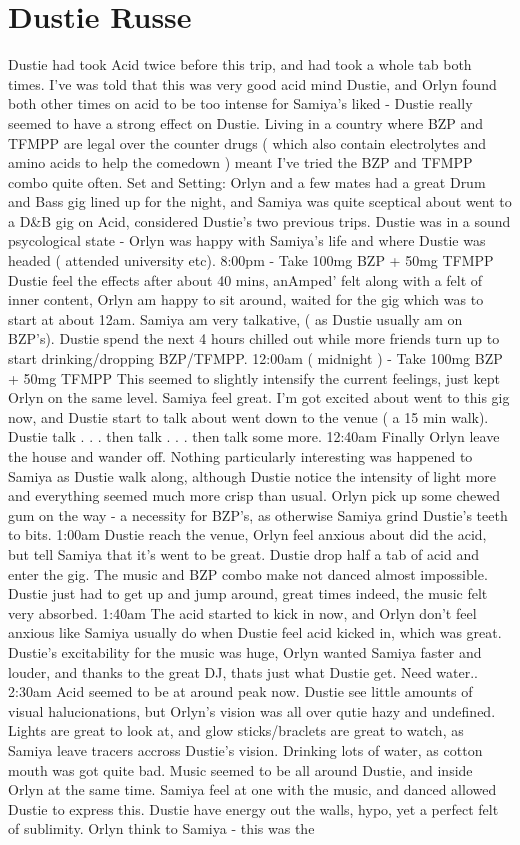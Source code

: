 \documentclass[12pt]{book}
\begin{document}
\chapter{Dustie Russe}

Dustie had took Acid twice before this trip, and had took a whole tab both times. I've was told that this was very good acid mind Dustie, and Orlyn found both other times on acid to be too intense for Samiya's liked - Dustie really seemed to have a strong effect on Dustie. Living in a country where BZP and TFMPP are legal over the counter drugs ( which also contain electrolytes and amino acids to help the comedown ) meant I've tried the BZP and TFMPP combo quite often. Set and Setting: Orlyn and a few mates had a great Drum and Bass gig lined up for the night, and Samiya was quite sceptical about went to a D\&B gig on Acid, considered Dustie's two previous trips. Dustie was in a sound psycological state - Orlyn was happy with Samiya's life and where Dustie was headed ( attended university etc). 8:00pm - Take 100mg BZP + 50mg TFMPP Dustie feel the effects after about 40 mins, anAmped' felt along with a felt of inner content, Orlyn am happy to sit around, waited for the gig which was to start at about 12am. Samiya am very talkative, ( as Dustie usually am on BZP's). Dustie spend the next 4 hours chilled out while more friends turn up to start drinking/dropping BZP/TFMPP. 12:00am ( midnight ) - Take 100mg BZP + 50mg TFMPP This seemed to slightly intensify the current feelings, just kept Orlyn on the same level. Samiya feel great. I'm got excited about went to this gig now, and Dustie start to talk about went down to the venue ( a 15 min walk). Dustie talk . . .  then talk . . .  then talk some more. 12:40am Finally Orlyn leave the house and wander off. Nothing particularly interesting was happened to Samiya as Dustie walk along, although Dustie notice the intensity of light more and everything seemed much more crisp than usual. Orlyn pick up some chewed gum on the way - a necessity for BZP's, as otherwise Samiya grind Dustie's teeth to bits. 1:00am Dustie reach the venue, Orlyn feel anxious about did the acid, but tell Samiya that it's went to be great. Dustie drop half a tab of acid and enter the gig. The music and BZP combo make not danced almost impossible. Dustie just had to get up and jump around, great times indeed, the music felt very absorbed. 1:40am The acid started to kick in now, and Orlyn don't feel anxious like Samiya usually do when Dustie feel acid kicked in, which was great. Dustie's excitability for the music was huge, Orlyn wanted Samiya faster and louder, and thanks to the great DJ, thats just what Dustie get. Need water.. 2:30am Acid seemed to be at around peak now. Dustie see little amounts of visual halucionations, but Orlyn's vision was all over qutie hazy and undefined. Lights are great to look at, and glow sticks/braclets are great to watch, as Samiya leave tracers accross Dustie's vision. Drinking lots of water, as cotton mouth was got quite bad. Music seemed to be all around Dustie, and inside Orlyn at the same time. Samiya feel at one with the music, and danced allowed Dustie to express this. Dustie have energy out the walls, hypo, yet a perfect felt of sublimity. Orlyn think to Samiya - this was the 
\end{document}
